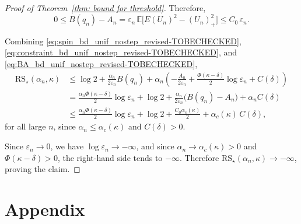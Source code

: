 \documentclass[11pt]{article}
\begin{document}
\begin{proof}[Proof of Theorem~\ref{thm: bound for threshold}]
Therefore,
\begin{equation}\label{eq:BA_bd_unif_nostep_revised-TOBECHECKED}
0\le B(q_n)-A_n
=
\varepsilon_n\,\mathbb E\big[E(U_n)^2-(U_n)_+^2\big]
\le C_0\,\varepsilon_n.
\end{equation}

Combining \eqref{eq:spin_bd_unif_nostep_revised-TOBECHECKED},
\eqref{eq:constraint_bd_unif_nostep_revised-TOBECHECKED}, and \eqref{eq:BA_bd_unif_nostep_revised-TOBECHECKED},
\begin{align*}
\mathrm{RS}_\star(\alpha_n,\kappa)
&\le
\log 2+\frac{\alpha_n}{2\varepsilon_n}B(q_n)
+\alpha_n\left(
-\frac{A_n}{2\varepsilon_n}
+\frac{\Phi(\kappa-\delta)}{2}\log\varepsilon_n
+C(\delta)\right)\\
&=
\frac{\alpha_n\Phi(\kappa-\delta)}{2}\log\varepsilon_n
+\log 2
+\frac{\alpha_n}{2\varepsilon_n}\big(B(q_n)-A_n\big)
+\alpha_n C(\delta)\\
&\le
\frac{\alpha_n\Phi(\kappa-\delta)}{2}\log\varepsilon_n
+\log 2
+\frac{C_0\alpha_c(\kappa)}{2}
+\alpha_c(\kappa)\,C(\delta),
\end{align*}
for all large $n$, since $\alpha_n\le \alpha_c(\kappa)$ and $C(\delta)>0$.

Since $\varepsilon_n\to 0$, we have $\log\varepsilon_n\to -\infty$, and since
$\alpha_n\to\alpha_c(\kappa)>0$ and $\Phi(\kappa-\delta)>0$, the right-hand side tends to $-\infty$.
Therefore $\mathrm{RS}_\star(\alpha_n,\kappa)\to -\infty$, proving the claim.

\end{proof}

\appendix
\section{Appendix}
\end{document}
